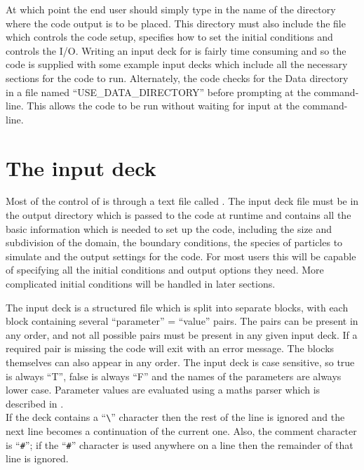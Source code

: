 At which point the end user should simply type in the name of the directory
where the code output is to be placed. This directory must also include the
file  which controls the code setup, specifies how to set the
initial conditions and controls the I/O. Writing an input deck for {\EPOCH} is
fairly time consuming and so the code is supplied with some example input decks
which include all the necessary sections for the code to run. Alternately, the
code checks for the Data directory in a file named ``USE\_DATA\_DIRECTORY''
before prompting at the command-line. This allows the code to be run without
waiting for input at the command-line.

\section{\texorpdfstring
  {The {\EPOCH} input deck}
  {The {EPOCH} input deck}}
\label{sec:input}
Most of the control of {\EPOCH} is through a text file called .
The input deck file must be in the output directory which is passed to the
code at runtime and contains all the basic
information which is needed to set up the code, including the size and
subdivision of the domain, the boundary conditions, the species of particles to
simulate and the output settings for the code. For most users this will be
capable of specifying all the initial conditions and output options they need.
More complicated initial conditions will be handled in later sections.

The input deck is a structured
file which is split into separate blocks, with each block containing several
``parameter'' = ``value'' pairs. The pairs can be present in any order, and not
all possible pairs must be present in any given input deck. If a required pair
is missing the code will exit with an error message. The blocks themselves can
also appear in any order. The input deck is case
sensitive, so true is always ``T'', false is always ``F'' and the names of
the parameters are always lower case.
Parameter values are evaluated using a maths parser which is described in
.\\

If the deck contains a ``\verb|\|'' character then the rest of the line
is ignored and the next line becomes a continuation of the current one. Also,
the comment character is ``\verb|#|''; if the ``\verb|#|'' character is used
anywhere on a line then the remainder of that line is ignored.\\


